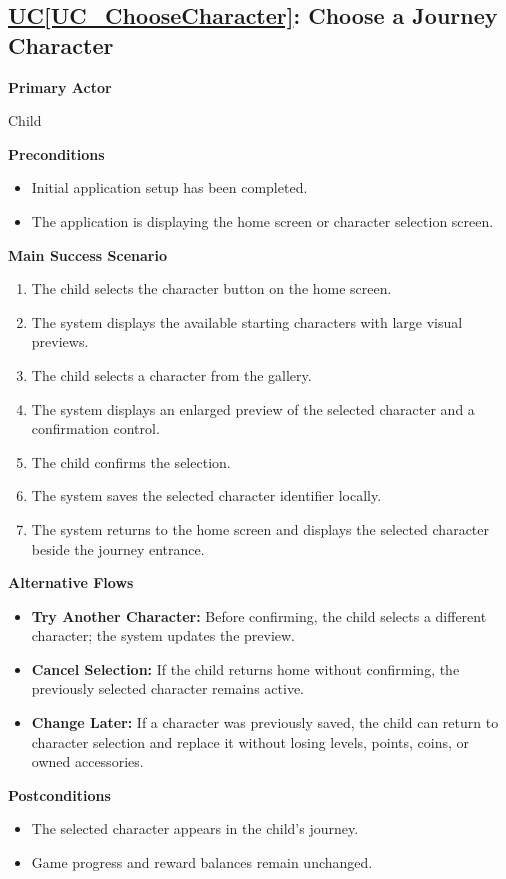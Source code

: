 \documentclass[12pt]{article}
\newcommand{\ucref}[1]{\hyperref[#1]{UC\ref*{#1}}}
\begin{document}
\subsection{\ucref{UC_ChooseCharacter}: Choose a Journey Character}

\textbf{Primary Actor}

Child

\textbf{Preconditions}
\begin{itemize}
    \item Initial application setup has been completed.
    \item The application is displaying the home screen or character
    selection screen.
\end{itemize}

\textbf{Main Success Scenario}
\begin{enumerate}
    \item The child selects the character button on the home screen.
    \item The system displays the available starting characters with
    large visual previews.
    \item The child selects a character from the gallery.
    \item The system displays an enlarged preview of the selected
    character and a confirmation control.
    \item The child confirms the selection.
    \item The system saves the selected character identifier locally.
    \item The system returns to the home screen and displays the
    selected character beside the journey entrance.
\end{enumerate}

\textbf{Alternative Flows}
\begin{itemize}
    \item \textbf{Try Another Character:} Before confirming, the child
    selects a different character; the system updates the preview.
    \item \textbf{Cancel Selection:} If the child returns home without
    confirming, the previously selected character remains active.
    \item \textbf{Change Later:} If a character was previously saved,
    the child can return to character selection and replace it without
    losing levels, points, coins, or owned accessories.
\end{itemize}

\textbf{Postconditions}
\begin{itemize}
    \item The selected character appears in the child's journey.
    \item Game progress and reward balances remain unchanged.
\end{itemize}
\end{document}
